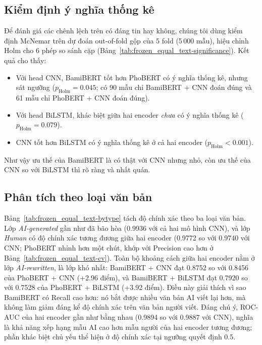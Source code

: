 \documentclass[11pt,a4paper]{article}
\newcommand{\todo}[1]{\textcolor{red}{[TODO: #1]}}
\begin{document}
\subsection{Kiểm định ý nghĩa thống kê}
Để đánh giá các chênh lệch trên có đáng tin hay không, chúng tôi dùng kiểm định McNemar trên dự đoán out-of-fold gộp của 5 fold (5\,000 mẫu), hiệu chỉnh Holm cho 6 phép so sánh cặp (Bảng~\ref{tab:frozen_equal_text-significance}). Kết quả cho thấy:
\begin{itemize}
  \item Với head CNN, BamiBERT tốt hơn PhoBERT có ý nghĩa thống kê, nhưng sát ngưỡng ($p_{\mathrm{Holm}} = 0.045$; có 90 mẫu chỉ BamiBERT + CNN đoán đúng và 61 mẫu chỉ PhoBERT + CNN đoán đúng).
  \item Với head BiLSTM, khác biệt giữa hai encoder \emph{chưa} có ý nghĩa thống kê ($p_{\mathrm{Holm}} = 0.079$).
  \item CNN tốt hơn BiLSTM có ý nghĩa thống kê ở cả hai encoder ($p_{\mathrm{Holm}} < 0.001$).
\end{itemize}
Như vậy ưu thế của BamiBERT là có thật với CNN nhưng nhỏ, còn ưu thế của CNN so với BiLSTM thì rõ ràng và nhất quán.

\IfFileExists{significance_table.tex}{}{\todo{chèn significance\_table.tex}}

\subsection{Phân tích theo loại văn bản}
Bảng~\ref{tab:frozen_equal_text-bytype} tách độ chính xác theo ba loại văn bản. Lớp \emph{AI-generated} gần như đã bão hòa (0.9936 với cả hai mô hình CNN), và lớp \emph{Human} có độ chính xác tương đương giữa hai encoder (0.9772 so với 0.9740 với CNN; PhoBERT nhỉnh hơn một chút, khớp với Precision cao hơn ở Bảng~\ref{tab:frozen_equal_text-cv}). Toàn bộ khoảng cách giữa hai encoder nằm ở lớp \emph{AI-rewritten}, là lớp khó nhất: BamiBERT + CNN đạt 0.8752 so với 0.8456 của PhoBERT + CNN (+2.96 điểm), và BamiBERT + BiLSTM đạt 0.7920 so với 0.7528 của PhoBERT + BiLSTM (+3.92 điểm). Điều này giải thích vì sao BamiBERT có Recall cao hơn: nó bắt được nhiều văn bản AI viết lại hơn, mà không làm giảm đáng kể độ chính xác trên văn bản người viết. Đáng chú ý, ROC-AUC của hai encoder gần như bằng nhau (0.9894 so với 0.9887 với CNN), nghĩa là khả năng xếp hạng mẫu AI cao hơn mẫu người của hai encoder tương đương; phần khác biệt chủ yếu thể hiện ở độ chính xác tại ngưỡng quyết định 0.5.
\end{document}
